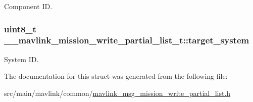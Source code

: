 Component I\+D. 

\hypertarget{struct____mavlink__mission__write__partial__list__t_aa5e77ea55d7e908035fab2d1b0beb898}{
\subsubsection[{target\+\_\+system}]{\setlength{\rightskip}{0pt plus 5cm}uint8\+\_\+t \+\_\+\+\_\+mavlink\+\_\+mission\+\_\+write\+\_\+partial\+\_\+list\+\_\+t\+::target\+\_\+system}}\label{struct____mavlink__mission__write__partial__list__t_aa5e77ea55d7e908035fab2d1b0beb898}


System I\+D. 



The documentation for this struct was generated from the following file\+:\begin{DoxyCompactItemize}
\item 
src/main/mavlink/common/\hyperlink{mavlink__msg__mission__write__partial__list_8h}{mavlink\+\_\+msg\+\_\+mission\+\_\+write\+\_\+partial\+\_\+list.\+h}\end{DoxyCompactItemize}
